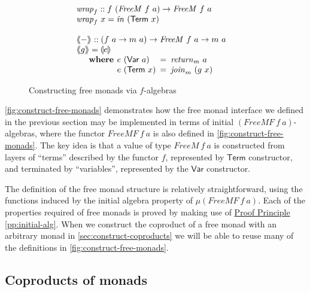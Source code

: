 \documentclass{jfp1}
\newcommand{\fold}[1]{\llparenthesis #1 \rrparenthesis}
\newcommand{\fmext}[1]{\langle\kern-0.25em\langle #1 \rangle\kern-0.25em\rangle}
\newcommand{\proofprinref}[1]{\hyperref[#1]{Proof Principle \ref*{#1}}}
\newcommand{\kw}[1]{\textbf{#1}}
\begin{document}
\begin{figure}
\begin{displaymath}
\begin{array}{@{}l}
\begin{array}{@{}l}
        \mathit{wrap}_f :: f~(\mathit{FreeM}~f~a) \to \mathit{FreeM}~f~a \\
        \mathit{wrap}_f~x = \mathit{in}~(\mathsf{Term}~x)
      \end{array} \\
      \\
      \begin{array}{@{}l}
        \fmext{-} :: (f~a \to m~a) \to \mathit{FreeM}~f~a \to m~a \\
        \fmext{g} = \fold{e} \\
        \quad\begin{array}{r@{\hspace{0.4em}}l@{\hspace{0.5em}}c@{\hspace{0.5em}}l}
          \kw{where} & e~(\mathsf{Var}~a) &=& \mathit{return}_m~a \\
          & e~(\mathsf{Term}~x) &=& \mathit{join}_m~(g~x)
        \end{array}
      \end{array}
    \end{array}
  \end{displaymath}
  
  \caption{Constructing free monads via $f$-algebras}
\label{fig:construct-free-monads}
\end{figure}

\autoref{fig:construct-free-monads} demonstrates how the free monad
interface we defined in the previous section may be implemented in
terms of initial $(\mathit{FreeMF}~f~a)$-algebras, where the functor
$\mathit{FreeMF}~f~a$ is also defined in
\autoref{fig:construct-free-monads}. The key idea is that a value of
type $\mathit{FreeM}~f~a$ is constructed from layers of ``terms''
described by the functor $f$, represented by $\mathsf{Term}$
constructor, and terminated by ``variables'', represented by the
$\mathsf{Var}$ constructor.

The definition of the free monad structure is relatively
straightforward, using the functions induced by the initial algebra
property of $\mu (\mathit{FreeMF}~f~a)$. Each of the properties
required of free monads is proved by making use of
\proofprinref{pp:initial-alg}. When we construct the coproduct of a
free monad with an arbitrary monad in
\autoref{sec:construct-coproducts} we will be able to reuse many of
the definitions in \autoref{fig:construct-free-monads}.

\subsection{Coproducts of monads}
\label{sec:coproducts-of-monads}
\end{document}
